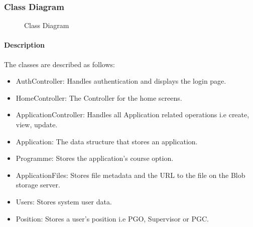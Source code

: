 \documentclass[11pt]{article}
\begin{document}
\subsubsection{Class Diagram}
\begin{figure}[H]
	\caption{Class Diagram}
	
\end{figure}
\paragraph{Description} \hfil\newline

The classes are described as follows:
\begin{itemize}
	\item AuthController: Handles authentication and displays the login page.
	\item HomeController: The Controller for the home screens.
	\item ApplicationController: Handles all Application related operations i.e create, view, update.
	\item Application: The data structure that stores an application.
	\item Programme: Stores the application's course option.
	\item ApplicationFiles: Stores file metadata and the URL to the file on the Blob storage server.
	\item Users: Stores system user data.
	\item Position: Stores a user's position i.e PGO, Supervisor or PGC.
\end{itemize}
\end{document}
